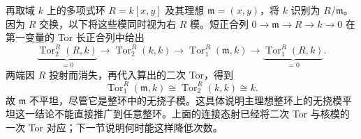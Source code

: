 \ProseParagraphBreak
再取域 \(k\) 上的多项式环 \(R=k[x,y]\) 及其理想 \(\mathfrak m=(x,y)\)，将 \(k\) 识别为 \(R/\mathfrak m\)。因为 \(R\) 交换，以下将这些模同时视为右 \(R\) 模。短正合列 \(0\to\mathfrak m\to R\to k\to0\) 在第一变量的 Tor 长正合列中给出
\[
	\underbrace{\operatorname{Tor}_2^R(R,k)}_{=0}\longrightarrow \operatorname{Tor}_2^R(k,k)\longrightarrow\operatorname{Tor}_1^R(\mathfrak m,k) \longrightarrow\underbrace{\operatorname{Tor}_1^R(R,k)}_{=0}.
\]
两端因 \(R\) 投射而消失，再代入算出的二次 Tor，得到
\[
	\operatorname{Tor}_1^R(\mathfrak m,k)\cong \operatorname{Tor}_2^R(k,k)\cong k.
\]
故 \(\mathfrak m\) 不平坦，尽管它是整环中的无挠子模。这具体说明主理想整环上的无挠模平坦这一结论不能直接推广到任意整环。上面的连接态射已经将二次 Tor 与核模的一次 Tor 对应；下一节说明何时能这样降低次数。
